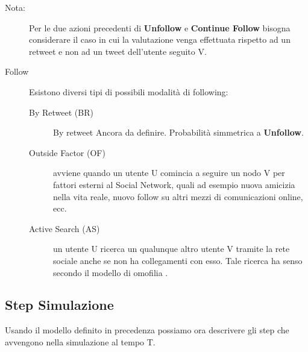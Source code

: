 \begin{description}
  \item[Nota:] Per le due azioni precedenti di \textbf{Unfollow} e
  \textbf{Continue Follow} bisogna considerare il caso in cui
  la valutazione venga effettuata rispetto ad un retweet e non ad
  un tweet dell'utente seguito V. 
  
  \item[Follow] Esistono diversi tipi di possibili modalit\`a di 
  following:
    \begin{description}
      \item[By Retweet (BR)] By retweet Ancora da definire. 
      Probabilit\`a simmetrica a \textbf{Unfollow}. 
      \item[Outside Factor (OF)] avviene quando un utente U comincia
      a seguire un nodo V per fattori esterni al Social Network, 
      quali ad esempio nuova amicizia nella vita reale, nuovo
      follow su altri mezzi di comunicazioni online, ecc.
      \item[Active Search (AS)] un utente U ricerca un qualunque 
      altro utente V tramite la rete sociale anche se non ha 
      collegamenti con esso. Tale ricerca ha senso secondo il
      modello di omofilia .       
    \end{description}
\end{description}

\subsection{Step Simulazione}
\label{subsec:step}

Usando il modello definito in precedenza possiamo ora descrivere gli 
step che avvengono nella simulazione al tempo T.

